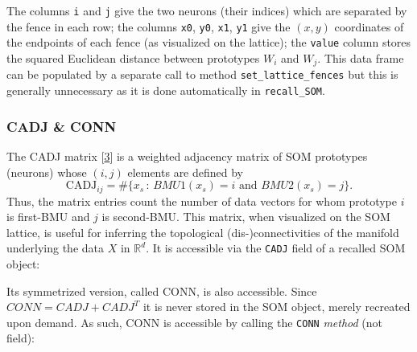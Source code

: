 \documentclass[]{article}
\newenvironment{Shaded}{\begin{snugshade}}{\end{snugshade}}
\newcommand{\CommentTok}[1]{\textcolor[rgb]{0.56,0.35,0.01}{\textit{#1}}}
\newcommand{\KeywordTok}[1]{\textcolor[rgb]{0.13,0.29,0.53}{\textbf{#1}}}
\newcommand{\NormalTok}[1]{#1}
\newcommand{\OperatorTok}[1]{\textcolor[rgb]{0.81,0.36,0.00}{\textbf{#1}}}
\begin{document}
The columns \texttt{i} and \texttt{j} give the two neurons (their indices) which are separated by the fence in each row; the columns \texttt{x0}, \texttt{y0}, \texttt{x1}, \texttt{y1} give the \((x,y)\) coordinates of the endpoints of each fence (as visualized on the lattice); the \texttt{value} column stores the squared Euclidean distance between prototypes \(W_i\) and \(W_j\). This data frame can be populated by a separate call to method \texttt{set\_lattice\_fences} but this is generally unnecessary as it is done automatically in \texttt{recall\_SOM}.

\hypertarget{cadj-conn}{%
\subsubsection{CADJ \& CONN}\label{cadj-conn}}

The CADJ matrix {[}\protect\hyperlink{ref-TasdemirMerenyi2009}{3}{]} is a weighted adjacency matrix of SOM prototypes (neurons) whose \((i,j)\) elements are defined by
\[ \text{CADJ}_{ij} = \#\{x_s \, : \, BMU1(x_s)=i \text{ and } BMU2(x_s)=j \}. \]
Thus, the matrix entries count the number of data vectors for whom prototype \(i\) is first-BMU and \(j\) is second-BMU. This matrix, when visualized on the SOM lattice, is useful for inferring the topological (dis-)connectivities of the manifold underlying the data \(X\) in \(\mathbb{R}^d\). It is accessible via the \texttt{CADJ} field of a recalled SOM object:

\begin{Shaded}
\end{Shaded}

Its symmetrized version, called CONN, is also accessible. Since \(CONN = CADJ + CADJ^T\) it is never stored in the SOM object, merely recreated upon demand. As such, CONN is accessible by calling the \texttt{CONN} \emph{method} (not field):

\begin{Shaded}
\end{Shaded}
\end{document}
